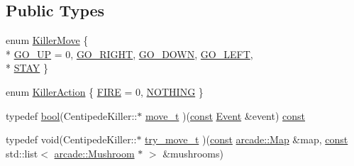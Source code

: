 \subsection*{Public Types}
\begin{DoxyCompactItemize}
\item 
enum \hyperlink{classarcade_1_1_centipede_killer_a2289a2e585e1d2d1b00acfd686ac59e7}{Killer\-Move} \{ \\*
\hyperlink{classarcade_1_1_centipede_killer_a2289a2e585e1d2d1b00acfd686ac59e7a7982b7306302d020333b3552234131f1}{G\-O\-\_\-\-U\-P} = 0, 
\hyperlink{classarcade_1_1_centipede_killer_a2289a2e585e1d2d1b00acfd686ac59e7a555bd065b3e40fd32109ff1ba53991bc}{G\-O\-\_\-\-R\-I\-G\-H\-T}, 
\hyperlink{classarcade_1_1_centipede_killer_a2289a2e585e1d2d1b00acfd686ac59e7a06b4b14c4d810b82042e6fc23daa70f9}{G\-O\-\_\-\-D\-O\-W\-N}, 
\hyperlink{classarcade_1_1_centipede_killer_a2289a2e585e1d2d1b00acfd686ac59e7aa4c25c08da02e1cd49cb0d164c592b0a}{G\-O\-\_\-\-L\-E\-F\-T}, 
\\*
\hyperlink{classarcade_1_1_centipede_killer_a2289a2e585e1d2d1b00acfd686ac59e7a38194dae94403f51f678df9b74a86887}{S\-T\-A\-Y}
 \}
\item 
enum \hyperlink{classarcade_1_1_centipede_killer_adf24bf801705dfd87e0eca469241a50c}{Killer\-Action} \{ \hyperlink{classarcade_1_1_centipede_killer_adf24bf801705dfd87e0eca469241a50caa08196f0683dc4fd8b8db993e725be22}{F\-I\-R\-E} = 0, 
\hyperlink{classarcade_1_1_centipede_killer_adf24bf801705dfd87e0eca469241a50cade8a91af89d6c3df760fa4b2dce275ba}{N\-O\-T\-H\-I\-N\-G}
 \}
\item 
typedef \hyperlink{term__entry_8h_a002004ba5d663f149f6c38064926abac}{bool}(Centipede\-Killer\-::$\ast$ \hyperlink{classarcade_1_1_centipede_killer_af8732a0ce12bf98ada3fcdb0f6884b0c}{move\-\_\-t} )(\hyperlink{term__entry_8h_a57bd63ce7f9a353488880e3de6692d5a}{const} \hyperlink{structarcade_1_1_event}{Event} \&event) \hyperlink{term__entry_8h_a57bd63ce7f9a353488880e3de6692d5a}{const} 
\item 
typedef void(Centipede\-Killer\-::$\ast$ \hyperlink{classarcade_1_1_centipede_killer_aeacd04a3942b4c061bc80b0a2f52d75b}{try\-\_\-move\-\_\-t} )(\hyperlink{term__entry_8h_a57bd63ce7f9a353488880e3de6692d5a}{const} \hyperlink{classarcade_1_1_map}{arcade\-::\-Map} \&map, \hyperlink{term__entry_8h_a57bd63ce7f9a353488880e3de6692d5a}{const} std\-::list$<$ \hyperlink{classarcade_1_1_mushroom}{arcade\-::\-Mushroom} $\ast$ $>$ \&mushrooms)
\end{DoxyCompactItemize}
